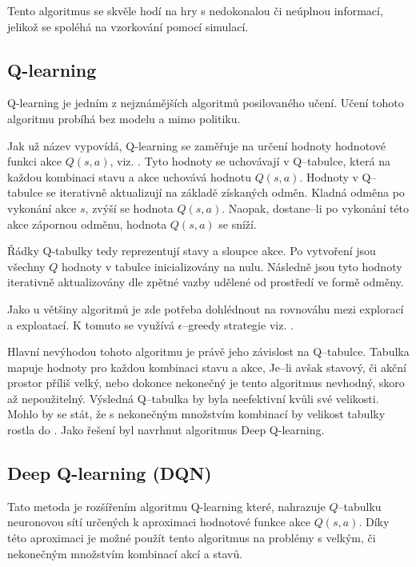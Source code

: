 Tento algoritmus se skvěle hodí na hry s nedokonalou či neúplnou informací, jelikož se spoléhá na vzorkování pomocí simulací.

\subsection{Q-learning}\label{subsec:q-learning}

Q-learning je jedním z nejznámějších algoritmů posilovaného učení.
Učení tohoto algoritmu probíhá bez modelu a mimo politiku.

Jak už název vypovídá, Q-learning se zaměřuje na určení hodnoty hodnotové funkci akce $Q(s, a)$, viz. .
Tyto hodnoty se uchovávají v Q--tabulce, která na každou kombinaci stavu a akce uchovává hodnotu $Q(s, a)$.
Hodnoty v Q--tabulce se iterativně aktualizují na základě získaných odměn.
Kladná odměna po vykonání akce $s$, zvýší se hodnota $Q(s, a)$.
Naopak, dostane--li po vykonání této akce zápornou odměnu, hodnota $Q(s, a)$ se sníží.

Řádky Q-tabulky tedy reprezentují stavy a sloupce akce.
Po vytvoření jsou všechny $Q$ hodnoty v tabulce inicializovány na nulu.
Následně jsou tyto hodnoty iterativně aktualizovány dle zpětné vazby udělené od prostředí ve formě odměny.

Jako u většiny algoritmů je zde potřeba dohlédnout na rovnováhu mezi explorací a exploatací.
K tomuto se využívá $\epsilon$--greedy strategie viz. .

Hlavní nevýhodou tohoto algoritmu je právě jeho závislost na Q--tabulce.
Tabulka mapuje hodnoty pro každou kombinaci stavu a akce,
Je--li avšak stavový, či akční prostor příliš velký, nebo dokonce nekonečný je tento algoritmus nevhodný, skoro až nepoužitelný.
Výsledná Q--tabulka by byla neefektivní kvůli své velikosti.
Mohlo by se stát, že s nekonečným množstvím kombinací by velikost tabulky rostla do .
Jako řešení byl navrhnut algoritmus Deep Q-learning.

\subsection{Deep Q-learning (DQN)}\label{subsec:deep-q-learning}

Tato metoda je rozšířením algoritmu Q-learning které,
nahrazuje $Q$--tabulku neuronovou sítí určených k aproximaci hodnotové funkce akce $Q(s, a)$.
Díky této aproximaci je možné použít tento algoritmus na problémy s velkým, či nekonečným množstvím kombinací akcí a stavů.

